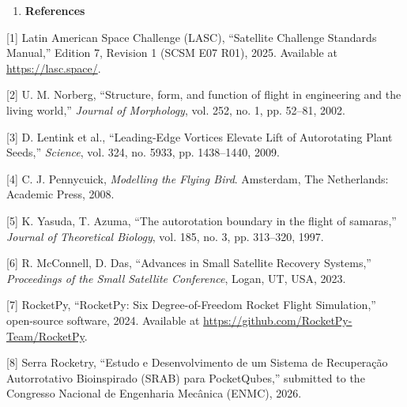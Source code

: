 \begin{enumerate}
\def\labelenumi{\arabic{enumi}.}
\setcounter{enumi}{5}
\item
  \textbf{References}
\end{enumerate}

[1] Latin American Space Challenge (LASC), ``Satellite Challenge
Standards Manual,'' Edition 7, Revision 1 (SCSM E07 R01), 2025.
Available at \url{https://lasc.space/}.

[2] U. M. Norberg, ``Structure, form, and function of flight in
engineering and the living world,'' \emph{Journal of Morphology},
vol. 252, no. 1, pp. 52--81, 2002.

[3] D. Lentink et al., ``Leading-Edge Vortices Elevate Lift of
Autorotating Plant Seeds,'' \emph{Science}, vol. 324, no. 5933,
pp. 1438--1440, 2009.

[4] C. J. Pennycuick, \emph{Modelling the Flying Bird}. Amsterdam,
The Netherlands: Academic Press, 2008.

[5] K. Yasuda, T. Azuma, ``The autorotation boundary in the flight of
samaras,'' \emph{Journal of Theoretical Biology}, vol. 185, no. 3,
pp. 313--320, 1997.

[6] R. McConnell, D. Das, ``Advances in Small Satellite Recovery
Systems,'' \emph{Proceedings of the Small Satellite Conference},
Logan, UT, USA, 2023.

[7] RocketPy, ``RocketPy: Six Degree-of-Freedom Rocket Flight
Simulation,'' open-source software, 2024. Available at
\url{https://github.com/RocketPy-Team/RocketPy}.

[8] Serra Rocketry, ``Estudo e Desenvolvimento de um Sistema de
Recuperação Autorrotativo Bioinspirado (SRAB) para PocketQubes,''
submitted to the Congresso Nacional de Engenharia Mecânica (ENMC),
2026.
